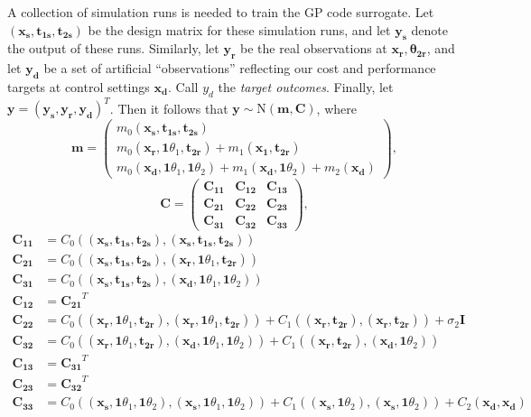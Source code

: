 \documentclass[12pt]{article}
\begin{document}
%
A collection of simulation runs is needed to train the GP code surrogate.
%
Let $(\mathbf{x_s},\mathbf{t_{1s}},\mathbf{t_{2s}})$ be the design matrix for these simulation runs, and let $\mathbf{y_s}$ denote the output of these runs.
%
Similarly, let $\mathbf{y_r}$ be the real observations at $\mathbf{x_r},\mathbf{\theta_{2r}}$, and let $\mathbf {y_d}$ be a set of artificial ``observations'' reflecting our cost and performance targets at control settings $\mathbf {x_d}$.
%
Call $y_d$ the {\em target outcomes}.
%
Finally, let $\mathbf y = (\mathbf{y_s},\mathbf{y_r},\mathbf{y_d})^T$.
%
Then it follows that $\mathbf y\sim \mathrm{N}(\mathbf m,\mathbf C)$, where
\[
\mathbf m = \begin{pmatrix}
m_0(\mathbf{x_s},\mathbf{t_{1s}},\mathbf{t_{2s}})\\
m_0(\mathbf{x_r},\mathbf1\theta_1,\mathbf{t_{2r}}) + m_1(\mathbf{x_1},\mathbf{t_{2r}})\\
m_0(\mathbf{x_d},\mathbf1\theta_1,\mathbf1\theta_2) + m_1(\mathbf{x_d},\mathbf1\theta_2) + m_2(\mathbf{x_d})
\end{pmatrix},
\]
\[
\mathbf C = \begin{pmatrix}
\mathbf{C_{11}} & \mathbf{C_{12}} & \mathbf{C_{13}}\\
\mathbf{C_{21}} & \mathbf{C_{22}} & \mathbf{C_{23}}\\
\mathbf{C_{31}} & \mathbf{C_{32}} & \mathbf{C_{33}}
\end{pmatrix},
\]
\begin{align*}
\mathbf{C_{11}}&=C_0\left((\mathbf{x_s},\mathbf{t_{1s}},\mathbf{t_{2s}}),(\mathbf{x_s},\mathbf{t_{1s}},\mathbf{t_{2s}})\right)\\
\mathbf{C_{21}}&=C_0\left((\mathbf{x_s},\mathbf{t_{1s}},\mathbf{t_{2s}}),(\mathbf{x_r},\mathbf1\theta_1,\mathbf{t_{2r}})\right)\\
\mathbf{C_{31}}&=C_0\left((\mathbf{x_s},\mathbf{t_{1s}},\mathbf{t_{2s}}),(\mathbf{x_d},\mathbf1\theta_1,\mathbf1\theta_2)\right)\\
\mathbf{C_{12}}&=\mathbf{C_{21}}^T\\
\mathbf{C_{22}}&=C_0\left((\mathbf{x_r},\mathbf1\theta_1,\mathbf{t_{2r}}),(\mathbf{x_r},\mathbf1\theta_1,\mathbf{t_{2r}})\right) + C_1\left( (\mathbf{x_r},\mathbf{t_{2r}}),(\mathbf{x_r},\mathbf{t_{2r}}) \right) + \sigma_2 \mathbf I\\
\mathbf{C_{32}}&=C_0\left((\mathbf{x_r},\mathbf1\theta_1,\mathbf{t_{2r}}),(\mathbf{x_d},\mathbf1\theta_1,\mathbf1\theta_2)\right) + C_1\left( (\mathbf{x_r},\mathbf{t_{2r}}),(\mathbf{x_d},\mathbf1\theta_2) \right)\\
\mathbf{C_{13}}&=\mathbf{C_{31}}^T\\
\mathbf{C_{23}}&=\mathbf{C_{32}}^T\\
\mathbf{C_{33}}&=C_0\left((\mathbf{x_s},\mathbf1\theta_1,\mathbf1\theta_2),(\mathbf{x_s},\mathbf1\theta_1,\mathbf1\theta_2)\right) + C_1\left( (\mathbf{x_s},\mathbf1\theta_2),(\mathbf{x_s},\mathbf1\theta_2) \right) + C_2(\mathbf{x_d},\mathbf{x_d})
\end{align*}
\end{document}
